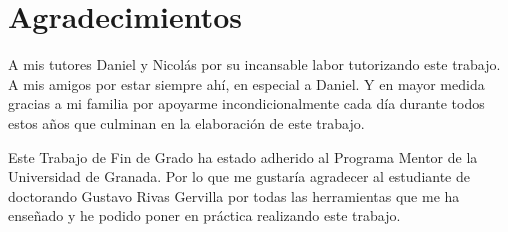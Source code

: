 %
\thispagestyle{empty}


\chapter*{Agradecimientos}\bigskip

A mis tutores Daniel y Nicolás por su incansable labor tutorizando este trabajo.  A mis amigos por estar siempre ahí, en especial  a Daniel. Y en mayor medida gracias a mi familia por apoyarme incondicionalmente cada día durante todos estos años que culminan en la elaboración de este trabajo.


Este Trabajo de Fin de Grado ha estado adherido al Programa Mentor de la Universidad de Granada. Por lo que me gustaría agradecer al estudiante de doctorando Gustavo Rivas Gervilla por todas las herramientas que me ha enseñado y he podido poner en práctica realizando este trabajo.
\medskip

\vfill

\cleardoublepage
\endinput
